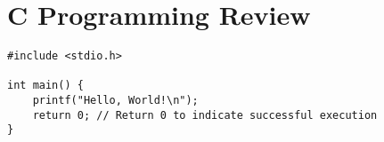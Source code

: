 \chapter{C Programming Review}\label{chp:crpogreview}


\begin{lstlisting}[style=cstyle, caption={A simple C program to print "Hello, World!"}, label={lst:hello-world}]
#include <stdio.h>

int main() {
    printf("Hello, World!\n");
    return 0; // Return 0 to indicate successful execution
}
\end{lstlisting}